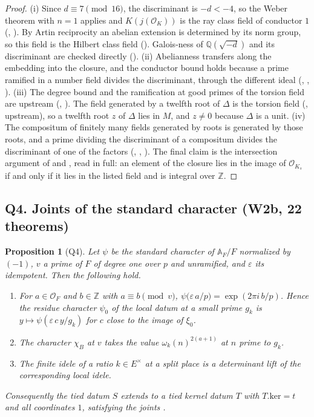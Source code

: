 \documentclass[11pt]{article}
\newcommand{\A}{\mathbb A}
\newtheorem{proposition}[theorem]{Proposition}
\theoremstyle{remark}
\begin{document}
\begin{proof}
(i) Since $d\equiv7\pmod{16}$, the discriminant is $-d<-4$, so the Weber theorem with $n=1$ applies and $K(j(\mathcal O_K))$ is the ray class field of conductor $1$ (, ). By Artin reciprocity an abelian extension is determined by its norm group, so this field is the Hilbert class field (). Galois-ness of $\mathbb Q(\sqrt{-d})$ and its discriminant are checked directly (). (ii) Abelianness transfers along the embedding into the closure, and the conductor bound holds because a prime ramified in a number field divides the discriminant, through the different ideal (, , ). (iii) The degree bound and the ramification at good primes of the torsion field are upstream (, ). The field generated by a twelfth root of $\Delta$ is the torsion field (, upstream), so a twelfth root $z$ of $\Delta$ lies in $M$, and $z\neq0$ because $\Delta$ is a unit. (iv) The compositum of finitely many fields generated by roots is generated by those roots, and a prime dividing the discriminant of a compositum divides the discriminant of one of the factors (, , ). The final claim is the intersection argument of  and , read in full: an element of the closure lies in the image of $\mathcal O_{K_s}$ if and only if it lies in the listed field and is integral over $\mathbb Z$.
\end{proof}

\subsection{Q4. Joints of the standard character (W2b, 22 theorems)}

\begin{proposition}[Q4]\label{prop:Q4}
Let $\psi$ be the standard character of $\A_F/F$ normalized by ~$(-1)$, $v$ a prime of $F$ of degree one over $p$ and unramified, and $\varepsilon$ its idempotent. Then the following hold.
\begin{enumerate}[label=(\roman*),itemsep=1pt]
\item For $a\in\mathcal O_F$ and $b\in\mathbb Z$ with $a\equiv b\pmod v$, $\psi\bigl(\varepsilon\,a/p\bigr)=\exp(2\pi i\,b/p)$. Hence the residue character $\psi_0$ of the local datum at a small prime $g_k$ is $y\mapsto\psi(\varepsilon\,c\,y/g_k)$ for $c$ close to the image of $\xi_0$.
\item The character $\chi_B$ at $v$ takes the value $\omega_k(n)^{2(a+1)}$ at $n$ prime to $g_k$.
\item The finite idele of a ratio $k\in E^\times$ at a split place is a determinant lift of the corresponding local idele.
\end{enumerate}
Consequently the tied datum $S$ extends to a tied kernel datum $T$ with $T.\mathrm{ker}=t$ and all coordinates $1$, satisfying the joints .
\end{proposition}
\end{document}
